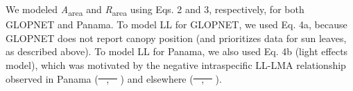 \documentclass[
  12pt,
  letterpaper,
  DIV=11,
  numbers=noendperiod]{scrartcl}
\providecommand{\DIFadd}[1]{{\protect\color{blue}\uwave{#1}}} %
\providecommand{\DIFdel}[1]{{\protect\color{red}\sout{#1}}}                      %
\providecommand{\DIFaddbegin}{} %
\providecommand{\DIFaddend}{} %
\providecommand{\DIFdelbegin}{} %
\providecommand{\DIFdelend}{} %
\newcommand{\DIFscaledelfig}{0.5}
\newlength{\DIFdelgraphicswidth} %
\newlength{\DIFdelgraphicsheight} %
\newcommand{\DIFaddincludegraphics}[2][]{{\color{blue}\fbox{\DIFOincludegraphics[#1]{#2}}}} %
\newcommand{\DIFdelincludegraphics}[2][]{%
\sbox{\DIFdelgraphicsbox}{\DIFOincludegraphics[#1]{#2}}%
\settoboxwidth{\DIFdelgraphicswidth}{\DIFdelgraphicsbox} %
\settoboxtotalheight{\DIFdelgraphicsheight}{\DIFdelgraphicsbox} %
\scalebox{\DIFscaledelfig}{%
\parbox[b]{\DIFdelgraphicswidth}{\usebox{\DIFdelgraphicsbox}\\[-\baselineskip] \rule{\DIFdelgraphicswidth}{0em}}\llap{\resizebox{\DIFdelgraphicswidth}{\DIFdelgraphicsheight}{%
\setlength{\unitlength}{\DIFdelgraphicswidth}%
\begin{picture}(1,1)%
\thicklines\linethickness{2pt} %
{\color[rgb]{1,0,0}\put(0,0){\framebox(1,1){}}}%
{\color[rgb]{1,0,0}\put(0,0){\line( 1,1){1}}}%
{\color[rgb]{1,0,0}\put(0,1){\line(1,-1){1}}}%
\end{picture}%
}\hspace*{3pt}}} %
} %
\DeclareRobustCommand{\DIFaddbegin}{\DIFOaddbegin \let\includegraphics\DIFaddincludegraphics} %
\DeclareRobustCommand{\DIFaddend}{\DIFOaddend \let\includegraphics\DIFOincludegraphics} %
\DeclareRobustCommand{\DIFdelbegin}{\DIFOdelbegin \let\includegraphics\DIFdelincludegraphics} %
\DeclareRobustCommand{\DIFdelend}{\DIFOaddend \let\includegraphics\DIFOincludegraphics} %
\begin{document}
We modeled \emph{A}\textsubscript{area} and \emph{R}\textsubscript{area}
using Eqs. 2 and 3, respectively, for both GLOPNET and Panama. To model
LL for GLOPNET, we used Eq. 4a, because GLOPNET does not report canopy
position (and prioritizes data for sun leaves, as described above). To
model LL for Panama, we also used Eq. 4b (light effects model), which
was motivated by the negative intraspecific LL-LMA relationship observed
in Panama (\DIFdelbegin \DIFdel{\mbox{%
}\hspace{0pt}%
,
\mbox{%
\citeproc{ref-Osnas2018}{Osnas et al. 2018}}\hspace{0pt}%
}\DIFdelend \DIFaddbegin \DIFadd{\mbox{%
\citeproc{ref-Osnas2018}{Osnas et al., 2018}}\hspace{0pt}%
;
\mbox{%
\citeproc{ref-Xu2017}{Xu et al., 2017}}\hspace{0pt}%
}\DIFaddend ) and elsewhere
(\DIFdelbegin \DIFdel{\mbox{%
\citeproc{ref-Lusk2008}{Lusk et al. 2008}}\hspace{0pt}%
,
\mbox{%
\citeproc{ref-Russo2016}{Russo and Kitajima 2016}}\hspace{0pt}%
}\DIFdelend \DIFaddbegin \DIFadd{\mbox{%
\citeproc{ref-Lusk2008}{Lusk et al., 2008}}\hspace{0pt}%
;
\mbox{%
\citeproc{ref-Russo2016}{Russo and Kitajima, 2016}}\hspace{0pt}%
}\DIFaddend ).
\end{document}
